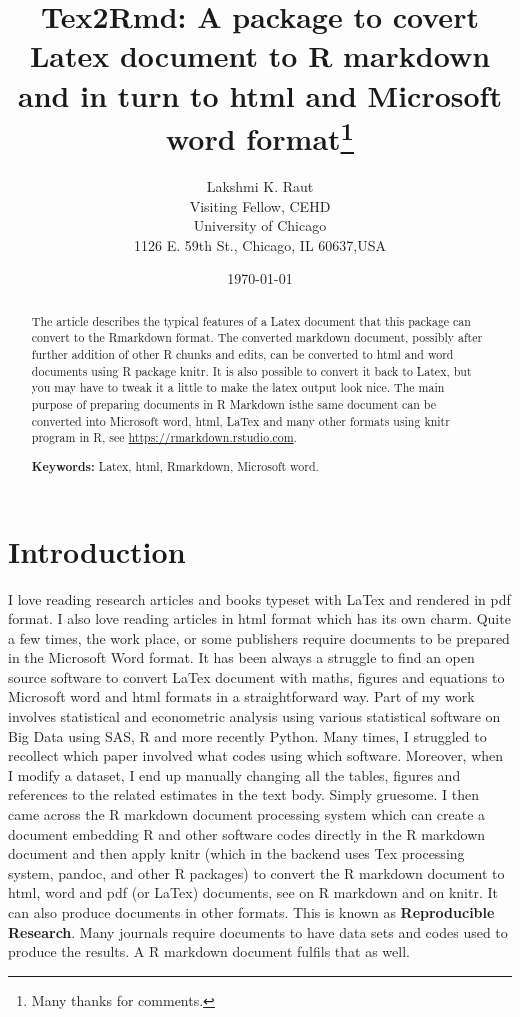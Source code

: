 \documentclass[12pt,svgnames]{article}
\begin{document}
\title{Tex2Rmd: A package to covert Latex document to R markdown and in turn to html and Microsoft word format\thanks{%
Many thanks for comments.
}}
\author{Lakshmi K. Raut \\
Visiting Fellow, CEHD\\
University of Chicago\\
1126 E. 59th St., Chicago, IL 60637,USA
}
\date{\today}
\maketitle 
\begin{abstract}
The article describes the typical features of a Latex document that this package can convert to the Rmarkdown format. The converted markdown document, possibly after further addition of other R chunks and edits, can be converted to html and word documents using R package knitr. It is also possible to convert it back to Latex, but you may have to tweak it a little to make the latex output look nice.  The main purpose of preparing documents in R Markdown isthe same document can be converted into Microsoft word, html, LaTex and many other formats using knitr program in R, see \url{https://rmarkdown.rstudio.com}.

\textbf{Keywords:} Latex, html, Rmarkdown, Microsoft word. 
\end{abstract}

\section{Introduction}\label{sec1}
I love reading research articles and books typeset with LaTex and rendered in pdf format. I also love reading articles in html format which has its own charm.   Quite a few times, the work place, or some publishers require documents to be prepared in the Microsoft Word format.  It has been always a struggle to find an open source software to convert LaTex document with maths, figures and equations to Microsoft word and html formats in a straightforward way. Part of my work involves statistical and econometric analysis using various statistical software on Big Data using SAS, R and more recently Python.  Many times, I struggled to recollect which paper involved what codes using which software.  Moreover, when I modify a dataset, I end up manually changing all the tables, figures and references to the related estimates in the text body. Simply gruesome.  I then came across the R markdown document processing system which can create a document embedding R and other software codes directly in the R markdown document and then apply knitr (which in the backend uses Tex processing system, pandoc, and other R packages) to convert the R markdown document to html, word and pdf (or LaTex) documents, see \cite{Xie.Riederer_2020} on R markdown and \cite{Xie_2015} on knitr.  It can also produce documents in other formats. This is known as \textbf{Reproducible Research}. Many journals require documents to have data sets and codes used to  produce the results. A R markdown document fulfils that as well.
\end{document}

